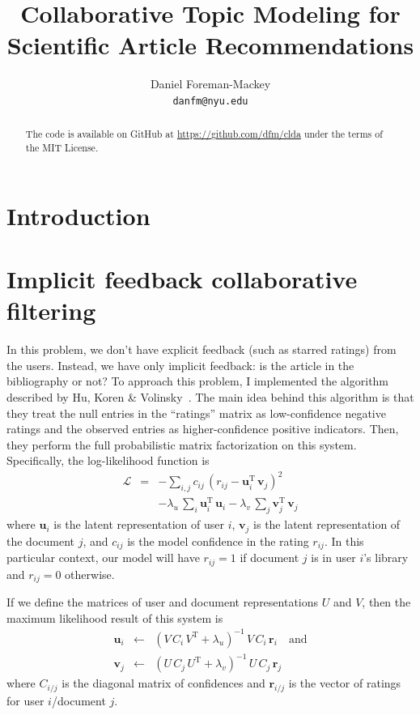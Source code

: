 \documentclass[11pt]{article}
\title{Collaborative Topic Modeling for Scientific Article Recommendations}
\author{Daniel Foreman-Mackey \\ {\tt danfm@nyu.edu} \\}
\begin{document}
\maketitle

\begin{abstract}
The code is available on GitHub at \url{https://github.com/dfm/clda} under the
terms of the MIT License.
\end{abstract}

\section{Introduction}

\section{Implicit feedback collaborative filtering}

In this problem, we don't have explicit feedback (such as starred ratings)
from the users.
Instead, we have only implicit feedback: is the article in the bibliography or
not?
To approach this problem, I implemented the algorithm described by Hu, Koren
\& Volinsky~.
The main idea behind this algorithm is that they treat the null entries in the
``ratings'' matrix as low-confidence negative ratings and the observed entries
as higher-confidence positive indicators.
Then, they perform the full probabilistic matrix factorization on this system.
Specifically, the log-likelihood function is
\begin{eqnarray}
\mathcal{L} &=& -\sum_{i,j}
                c_{ij}\,(r_{ij}-\mathbf{u}_i^\mathrm{T}\,\mathbf{v}_j)^2
\nonumber\\
&& - \lambda_u\,\sum_i \mathbf{u}_i^\mathrm{T}\,\mathbf{u}_i
 - \lambda_v\,\sum_j \mathbf{v}_j^\mathrm{T}\,\mathbf{v}_j
\end{eqnarray}
where $\mathbf{u}_i$ is the latent representation of user $i$,
$\mathbf{v}_j$ is the latent representation of the document $j$, and $c_{ij}$
is the model confidence in the rating $r_{ij}$.
In this particular context, our model will have $r_{ij} = 1$ if document $j$
is in user $i$'s library and $r_{ij} = 0$ otherwise.

If we define the matrices of user and document representations $U$ and $V$,
then the maximum likelihood result of this system is
\begin{eqnarray}
\mathbf{u}_i &\gets& (V\,C_i\,V^\mathrm{T}+\lambda_u)^{-1}\,
                     V\,C_i\,\mathbf{r}_i
\quad \mathrm{and} \nonumber \\
\mathbf{v}_j &\gets& (U\,C_j\,U^\mathrm{T} + \lambda_v)^{-1}\,U\,C_j\,
                     \mathbf{r}_j
\end{eqnarray}
where $C_{i/j}$ is the diagonal matrix of confidences and $\mathbf{r}_{i/j}$
is the vector of ratings for user $i$/document $j$.
\end{document}
